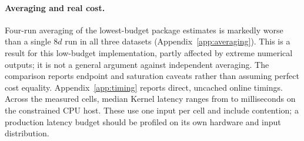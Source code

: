 \begin{table}[t]
\centering\small

\caption{Agreement of \emph{exact} explanations across independent background draws. Model means receive equal weight; intervals bootstrap the eight matched cases in each dataset, conditional on the eight saved draws per case/size. Top-three and numerical-agreement entries are percentages; maximum-error differences are in probability units.}
\label{tab:bg}
\end{table}

\paragraph{Averaging and real cost.}
Four-run averaging of the lowest-budget package estimates is markedly worse than a single $8d$ run in all three datasets (Appendix~\ref{app:averaging}). This is a result for this low-budget implementation, partly affected by extreme numerical outputs; it is not a general argument against independent averaging. The comparison reports endpoint and saturation caveats rather than assuming perfect cost equality. Appendix~\ref{app:timing} reports direct, uncached online timings. Across the measured cells, median Kernel latency ranges from \TimeMin{} to \TimeMax{} milliseconds on the constrained CPU host. These use one input per cell and include contention; a production latency budget should be profiled on its own hardware and input distribution.

